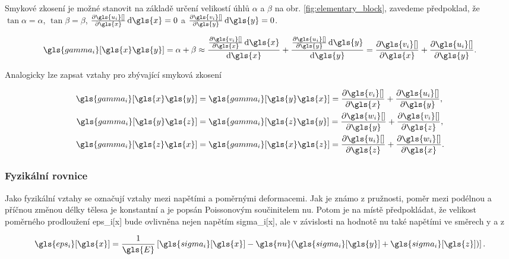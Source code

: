 Smykové zkosení je možné stanovit na základě určení velikostí úhlů $\alpha$ a $\beta$ na obr. \ref{fig:elementary_block}, zavedeme předpoklad, že $\tan{\alpha} = \alpha$, $\tan{\beta}=\beta$, $\pdv{\gls{u_i}[ ]}{\gls{x}} \dd{\gls{x}} = 0$ a $\pdv{\gls{v_i}[ ]}{\gls{y}}\dd{\gls{y}} = 0$.

\begin{equation}
    \gls{gamma_i}[\gls{x}\gls{y}]
    =
    \alpha + \beta
    \approx
    \frac{\pdv{\gls{v_i}[ ]}{\gls{x}}\dd{\gls{x}}}{\dd{\gls{x}}}
    +
    \frac{\pdv{\gls{u_i}[ ]}{\gls{y}}\dd{\gls{y}}}{\dd{\gls{y}}}
    =
    \pdv{\gls{v_i}[ ]}{\gls{x}} + \pdv{\gls{u_i}[ ]}{\gls{y}}
    .
\end{equation}

Analogicky lze zapsat vztahy pro zbývající smyková zkosení

\begin{equation}
    \begin{aligned}
        \gls{gamma_i}[\gls{x}\gls{y}] & = \gls{gamma_i}[\gls{y}\gls{x}] = \pdv{\gls{v_i}[ ]}{\gls{x}} + \pdv{\gls{u_i}[ ]}{\gls{y}}, \\
        \gls{gamma_i}[\gls{y}\gls{z}] & = \gls{gamma_i}[\gls{z}\gls{y}] = \pdv{\gls{w_i}[ ]}{\gls{y}} + \pdv{\gls{v_i}[ ]}{\gls{z}}, \\
        \gls{gamma_i}[\gls{z}\gls{x}] & = \gls{gamma_i}[\gls{x}\gls{z}] = \pdv{\gls{u_i}[ ]}{\gls{z}} + \pdv{\gls{w_i}[ ]}{\gls{x}}.
    \end{aligned}
\end{equation}

\subsubsection*{Fyzikální rovnice}

Jako fyzikální vztahy se označují vztahy mezi napětími a poměrnými deformacemi. Jak je známo z pružnosti, poměr mezi podélnou a příčnou změnou délky tělesa je konstantní a je popsán Poissonovým součinitelem \gls{nu}. Potom je na místě předpokládat, že velikost poměrného prodloužení \gls{eps_i}[\gls{x}] bude ovlivněna nejen napětím \gls{sigma_i}[\gls{x}], ale v závislosti na hodnotě \gls{nu} také napětími ve směrech \gls{y} a \gls{z} \cite[7]{teorie_pruznosti}

\begin{equation}
    \gls{eps_i}[\gls{x}] = \frac{1}{\gls{E}} \left[ \gls{sigma_i}[\gls{x}] - \gls{nu} (\gls{sigma_i}[\gls{y}] + \gls{sigma_i}[\gls{z}])  \right].
\end{equation}


